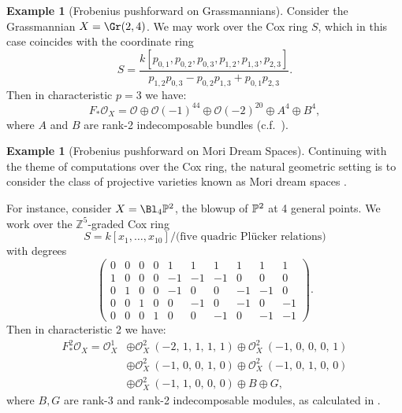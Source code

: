 \documentclass[12pt]{amsart}
\def\OO{\mathcal O}
\def\ZZ{\mathbb Z}
\theoremstyle{theorem}
\numberwithin{thm}{section}
\theoremstyle{definition}
\newtheorem{exa}[thm]{Example}
\begin{document}
\begin{exa}[Frobenius pushforward on Grassmannians]
  Consider the Grassmannian $X = \Gr(2,4)$. We may work over the Cox ring $S$,
  which in this case coincides with the coordinate ring
  \[ S = \frac{k[p_{0,1},p_{0,2},p_{0,3},p_{1,2},p_{1,3},p_{2,3}]}{p_{1,2}p_{0,3}-p_{0,2}p_{1,3}+p_{0,1}p_{2,3}}. \]
  Then in characteristic $p=3$ we have:
  \[ F_*\OO_X = \OO \oplus \OO(-1)^{44} \oplus \OO(-2)^{20} \oplus A^4 \oplus B^4, \]
  where $A$ and $B$ are rank-2 indecomposable bundles (c.f.~\cite{RSVdB22}).
\end{exa}

\begin{exa}[Frobenius pushforward on Mori Dream Spaces]
  Continuing with the theme of computations over the Cox ring, the natural geometric setting is to consider the class of projective varieties known as Mori dream spaces \cite{HK00}.

  For instance, consider $X = \Bl_4\P^2$, the blowup of $\P^2$ at 4 general points. We work over the $\ZZ^5$-graded Cox ring
  \[ S = k[x_1,\dots,x_{10}]/\text{(five quadric Pl\"ucker relations)} \]
  with degrees
  \[
  \left(\!\begin{array}{rrrrrrrrrr}
  0&0&0&0&1&1&1&1&1&1 \\
  1&0&0&0&-1&-1&-1&0&0&0 \\
  0&1&0&0&-1&0&0&-1&-1&0 \\
  0&0&1&0&0&-1&0&-1&0&-1 \\
  0&0&0&1&0&0&-1&0&-1&-1
  \end{array}\!\right).
  \]
  Then in characteristic 2 we have:
  \begin{align*}
    F_*^2\OO_X = {\OO_{X}^{1}}
    &\oplus {\OO_{X}^{2}\ \left(-2,\,1,\,1,\,1,\,1\right)} \oplus {\OO_{X}^{2}\ \left(-1,\,0,\,0,\,0,\,1\right)} \\
    &\oplus {\OO_{X}^{2}\ \left(-1,\,0,\,0,\,1,\,0\right)} \oplus {\OO_{X}^{2}\ \left(-1,\,0,\,1,\,0,\,0\right)} \\
    &\oplus {\OO_{X}^{2}\ \left(-1,\,1,\,0,\,0,\,0\right)} \oplus B \oplus G,
  \end{align*}
  where $B, G$ are rank-3 and rank-2 indecomposable modules, as calculated in \cite{Hara15}.
\end{exa}
\end{document}
